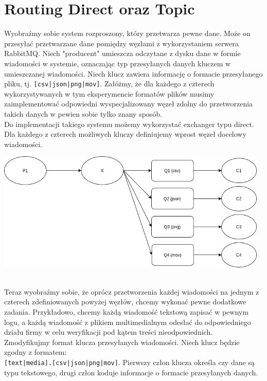 \documentclass{article}
\begin{document}
    \section{Routing Direct oraz Topic}
        Wyobraźmy sobie system rozproszony, który przetwarza pewne dane. Może on przesyłać przetwarzane dane pomiędzy węzłami z wykorzystaniem serwera RabbitMQ. Niech "producent" umieszcza odczytane z dysku dane w formie wiadomości w systemie, oznaczając typ przesyłanych danych kluczem w umieszczanej wiadomości. 
        Niech klucz zawiera informację o formacie przesyłanego pliku, tj. \texttt{[csv|json|png|mov]}. 
        Załóżmy, że dla każdego z czterech wykorzystywanych w tym eksperymencie formatów plików musimy zaimplementować odpowiedni wyspecjalizowany węzeł zdolny do przetworzenia takich danych w pewien sobie tylko znany sposób.\\
        Do implementacji takiego systemu możemy wykorzystać exchanger typu direct. Dla każdego z czterech możliwych kluczy definiujemy wprost węzeł docelowy wiadomości. 
        \begin{center}
            \includegraphics[width=13cm]{lab2/report/ex3_1.png}
        \end{center}\\
        Teraz wyobraźmy sobie, że oprócz przetworzenia każdej wiadomości na jednym z czterech zdefiniowanych powyżej węzłów, chcemy wykonać pewne dodatkowe zadania. Przykładowo, chcemy każdą wiadomość tekstową zapisać w pewnym logu, a każdą wiadomość z plikiem multimedialnym odesłać do odpowiedniego działu firmy w celu weryfikacji pod kątem treści nieodpowiednich.\\
        Zmodyfikujmy format klucza przesyłanych wiadomości. Niech klucz będzie zgodny z formatem:\\ \texttt{[text|media].[csv|json|png|mov]}. Pierwszy człon klucza określa czy dane są typu tekstowego, drugi człon koduje informacje o formacie przesyłanych danych.\\
\end{document}
